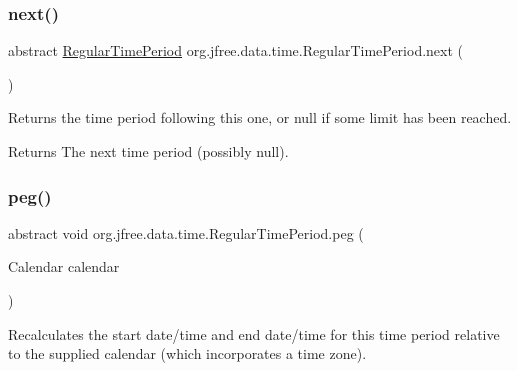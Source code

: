 \mbox{\label{classorg_1_1jfree_1_1data_1_1time_1_1_regular_time_period_a1699523baa1cc5e9a39261a6415c1d28}} 
\subsubsection{\texorpdfstring{next()}{next()}}
{\footnotesize\ttfamily abstract \mbox{\hyperlink{classorg_1_1jfree_1_1data_1_1time_1_1_regular_time_period}{Regular\+Time\+Period}} org.\+jfree.\+data.\+time.\+Regular\+Time\+Period.\+next (\begin{DoxyParamCaption}{ }\end{DoxyParamCaption})\hspace{0.3cm}{\ttfamily [abstract]}}

Returns the time period following this one, or {\ttfamily null} if some limit has been reached.

\begin{DoxyReturn}{Returns}
The next time period (possibly {\ttfamily null}). 
\end{DoxyReturn}
\mbox{\label{classorg_1_1jfree_1_1data_1_1time_1_1_regular_time_period_ae3251d790d4e91328a451b741bfa1e37}} 
\subsubsection{\texorpdfstring{peg()}{peg()}}
{\footnotesize\ttfamily abstract void org.\+jfree.\+data.\+time.\+Regular\+Time\+Period.\+peg (\begin{DoxyParamCaption}\item[{Calendar}]{calendar }\end{DoxyParamCaption})\hspace{0.3cm}{\ttfamily [abstract]}}

Recalculates the start date/time and end date/time for this time period relative to the supplied calendar (which incorporates a time zone).



